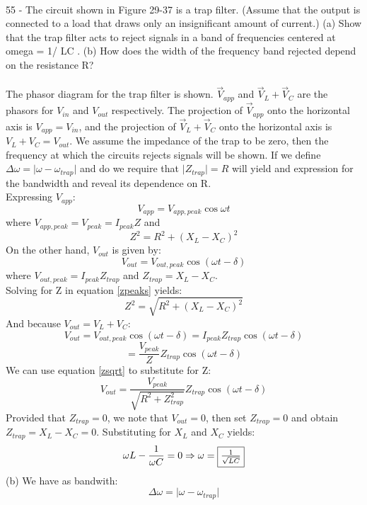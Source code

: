 \documentclass{report}
\begin{document}
\paragraph{}
55 - The circuit shown in Figure 29-37 is a trap filter. (Assume that the output is connected to a load that draws only an insignificant amount of current.) (a) Show that the trap filter acts to reject signals in a band of frequencies centered at omega = 1/ LC . (b) How does the width of the frequency band rejected depend on the resistance R?\\
\\
The phasor diagram for the trap filter is shown. $\vec V_{app}$ and $\vec V_L + \vec V_C$ are the phasors for $V_{in}$ and $V_{out}$ respectively. The projection of $\vec V_{app}$ onto the horizontal axis is $V_{app} = V_{in}$, and the projection of $\vec V_L + \vec V_C$ onto the horizontal axis is $V_L + V_C = V_{out}$. We assume the impedance of the trap to be zero, then the frequency at which the circuits rejects signals will be shown. If we define $\Delta \omega = \lvert \omega - \omega_{trap} \rvert$ and do we require that $\lvert Z_{trap} \rvert = R$ will yield and expression for the bandwidth and reveal its dependence on R.\\
Expressing $V_{app}$:
$$V_{app} = V_{app, peak} \cos \omega t$$
where $V_{app, peak} = V_{peak} = I_{peak}Z$ and
\begin{equation}\label{zpeaks}
  Z^2 = R^2 + (X_L - X_C)^2
\end{equation}
On the other hand, $V_{out}$ is given by:
$$V_{out} = V_{out, peak} \cos (\omega t - \delta)$$
where $V_{out, peak} = I_{peak}Z_{trap}$ and $Z_{trap} = X_L - X_C$.\\
Solving for Z in equation \ref{zpeaks} yields:
\begin{equation}\label{zsqrt}
  Z^2 = \sqrt{R^2 + (X_L - X_C)^2}
\end{equation}
And because $V_{out} = V_L + V_C$:
$$V_{out} = V_{out, peak} \cos (\omega t - \delta) = I_{peak}Z_{trap} \cos (\omega t - \delta)$$
$$= \frac{V_{peak}}{Z}Z_{trap} \cos (\omega t - \delta)$$
We can use equation \ref{zsqrt} to substitute for Z:
$$V_{out} = \frac{V_{peak}}{\sqrt{R^2 + Z_{trap}^2}} Z_{trap} \cos (\omega t - \delta)$$
Provided that $Z_{trap} = 0$, we note that $V_{out} = 0$, then set $Z_{trap} = 0$ and obtain $Z_{trap} = X_L - X_C = 0$. Substituting for $X_L$ and $X_C$ yields:
$$\omega L - \frac{1}{\omega C} = 0 \Rightarrow \omega = \fbox{$\frac{1}{\sqrt{LC}}$}$$
(b) We have as bandwith:
\begin{equation}\label{bwt}
  \Delta \omega = \lvert \omega - \omega_{trap} \rvert
\end{equation}
\end{document}
